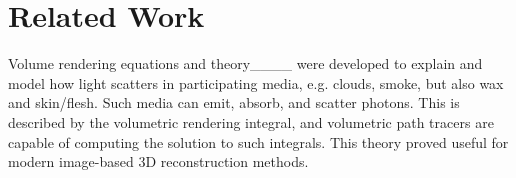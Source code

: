\section{Related Work}
\begin{comment}
Volume rendering is concerned about how light scatters in participating media, e.g. clouds, smoke, but also wax and skin / flesh.
Such media can absorb, create, and scatter photons.
This is described by the volumetric rendering integral, and volumetric path tracers are capable of computing the solution to such integrals.
\reftodo{some vol pt refs}
Often, scattering can be discarded as the full gamut of effects is not necessary.
This results in the somewhat simplified Equation \ref{eq:volumetric_integration}.
\reftodo{simplified, used in vis}

NERFs take Equation \ref{eq:volumetric_integration}, a differentiable rendering algorithm based on ray marching, a data model based on multi-layer perceptrons (MLPs), and learn their weights by means of backpropagation through the ray marcher and gradient decent. \reftodo{..}

EWA splatting, introduced by \reftodo{zwicker et. al} is a method to compute an approximation of Equation \ref{eq:volumetric_integration}.
To do so, the volumetric data is stored in Gaussian mixtures, which are then sorted and projected to the screen.

3D Gaussian Splatting for Real-Time Radiance Field Rendering (3DGS) basically took the EWA splatting algorithm, simplified it a bit more (by using the opacity formulation), made it even faster, and made it possible to learn Gaussian mixtures by backpropagation and gradient decent.

Stop the pop (STP) is an improvement on 3DGS, where they implemented a per-pixel sorting step and hierarchical culling to make it tracktable \todo{is that correct? extend as i know really little about it}.
\end{comment}
Volume rendering equations and theory____ were developed to explain and model how light scatters in participating media, e.g. clouds, smoke, but also wax and skin/flesh. Such media can emit, absorb, and scatter photons. This is described by the volumetric rendering integral, and volumetric path tracers are capable of computing the solution to such integrals.
This theory proved useful for modern image-based 3D reconstruction methods. 

